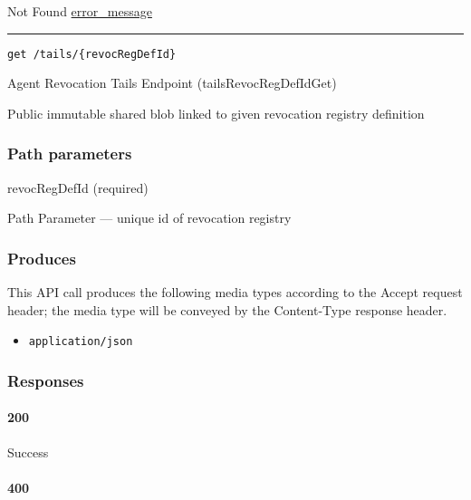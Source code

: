 Not Found \protect\hyperlink{error_message}{error\_message}

\begin{center}\rule{0.5\linewidth}{\linethickness}\end{center}

\protect\hypertarget{tailsRevocRegDefIdGet}{}{}

\begin{verbatim}
get /tails/{revocRegDefId}
\end{verbatim}

Agent Revocation Tails Endpoint ({tailsRevocRegDefIdGet})

Public immutable shared blob linked to given revocation registry
definition

\hypertarget{path-parameters-46}{%
\subsubsection{Path parameters}\label{path-parameters-46}}

revocRegDefId (required)

{Path Parameter} --- unique id of revocation registry

\hypertarget{produces-88}{%
\subsubsection{Produces}\label{produces-88}}

This API call produces the following media types according to the
{Accept} request header; the media type will be conveyed by the
{Content-Type} response header.

\begin{itemize}
\tightlist
\item
  \texttt{application/json}
\end{itemize}

\hypertarget{responses-90}{%
\subsubsection{Responses}\label{responses-90}}

\hypertarget{section-294}{%
\paragraph{200}\label{section-294}}

Success \protect\hyperlink{}{}

\hypertarget{section-295}{%
\paragraph{400}\label{section-295}}

